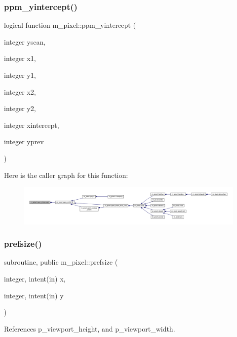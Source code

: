 \subsubsection{\texorpdfstring{ppm\+\_\+yintercept()}{ppm\_yintercept()}}
{\footnotesize\ttfamily logical function m\+\_\+pixel\+::ppm\+\_\+yintercept (\begin{DoxyParamCaption}\item[{integer}]{yscan,  }\item[{integer}]{x1,  }\item[{integer}]{y1,  }\item[{integer}]{x2,  }\item[{integer}]{y2,  }\item[{integer}]{xintercept,  }\item[{integer}]{yprev }\end{DoxyParamCaption})\hspace{0.3cm}{\ttfamily [private]}}

Here is the caller graph for this function\+:
\nopagebreak
\begin{figure}[H]
\begin{center}
\leavevmode
\includegraphics[width=350pt]{namespacem__pixel_a4924b3a5033acb74a4f4df60a4ba21eb_icgraph}
\end{center}
\end{figure}
\mbox{\label{namespacem__pixel_acc868686f05b7e0b3cd33bf9d1c6bb98}} 
\subsubsection{\texorpdfstring{prefsize()}{prefsize()}}
{\footnotesize\ttfamily subroutine, public m\+\_\+pixel\+::prefsize (\begin{DoxyParamCaption}\item[{integer, intent(in)}]{x,  }\item[{integer, intent(in)}]{y }\end{DoxyParamCaption})}



References p\+\_\+viewport\+\_\+height, and p\+\_\+viewport\+\_\+width.

